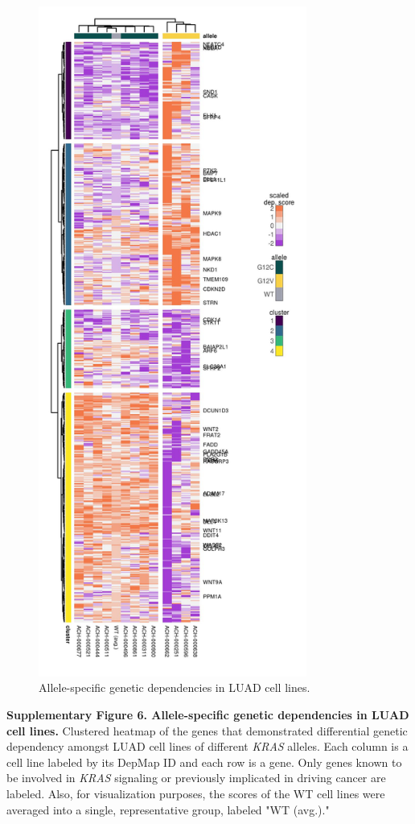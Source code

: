 \documentclass[english, 10pt, letterpaper]{article}
\newcommand{\KRAS}{\emph{KRAS}}
\begin{document}
\begin{figure}[h!]
\centering
\includegraphics[width=88mm]{figures/Supp_Fig_6.jpeg}
\caption{Allele-specific genetic dependencies in LUAD cell lines.}
\label{sfig:luad-dependency-heatmap}
\end{figure}

\newpage
\noindent \textbf{Supplementary Figure 6. Allele-specific genetic dependencies in LUAD cell lines.}
Clustered heatmap of the genes that demonstrated differential genetic dependency amongst LUAD cell lines of different \KRAS{} alleles. Each column is a cell line labeled by its DepMap ID and each row is a gene. Only genes known to be involved in \KRAS{} signaling or previously implicated in driving cancer are labeled. Also, for visualization purposes, the scores of the WT cell lines were averaged into a single, representative group, labeled "WT (avg.)."
\newpage
\end{document}
